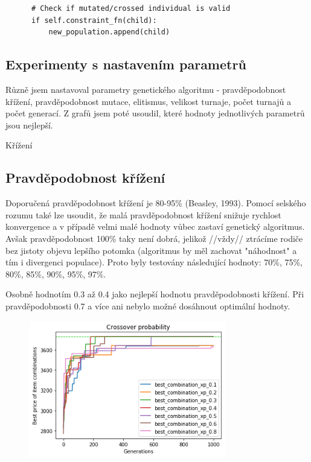 \documentclass[a4paper,10pt,twocolumn]{article}
\begin{document}
\begin{itemize}
\begin{itemize}
\begin{verbatim}
      # Check if mutated/crossed individual is valid
      if self.constraint_fn(child):
          new_population.append(child)
   \end{verbatim}





\subsection{Experimenty s nastavením parametrů}


Různě jsem nastavoval parametry genetického algoritmu - pravděpodobnost křížení, pravděpodobnost mutace, elitismus, velikost turnaje, počet turnajů a počet generací. Z grafů jsem poté usoudil, které hodnoty jednotlivých parametrů jsou nejlepší.


Křížení
\subsection{Pravděpodobnost křížení}
Doporučená pravděpodobnost křížení je 80-95\% (Beasley, 1993). Pomocí selského rozumu také lze usoudit, že malá pravděpodobnost křížení snižuje rychlost konvergence a v případě velmi malé hodnoty vůbec zastaví genetický algoritmus. Avšak pravděpodobnost 100\% taky není dobrá, jelikož //vždy// ztrácíme rodiče bez jistoty objevu lepšího potomka (algoritmus by měl zachovat "náhodnost" a tím i divergenci populace). Proto byly testovány následující hodnoty: 70\%, 75\%, 80\%, 85\%, 90\%, 95\%, 97\%.

Osobně hodnotím 0.3 až 0.4 jako nejlepší hodnotu pravděpodobnosti křížení. Při pravděpodobnosti 0.7 a více ani nebylo možné dosáhnout optimální hodnoty.

\begin{figure}[H]
  \begin{center}
    \includegraphics[height=6cm]{graphs/xover_probability.png}
  \end{center}
\end{figure}


\end{itemize}
\end{itemize}
\end{document}
